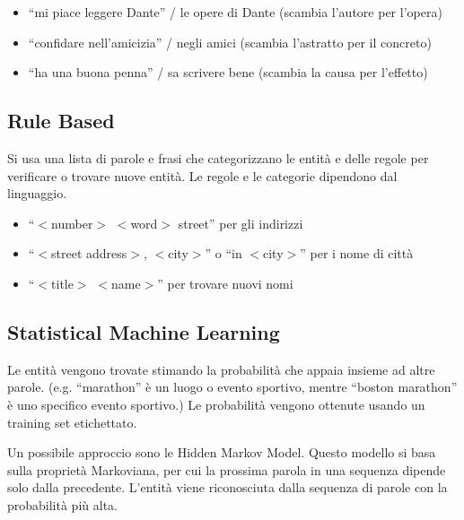 \begin{itemize}
  \item “mi piace leggere Dante” / le opere di Dante (scambia l'autore per l'opera)
  \item “confidare nell'amicizia” / negli amici (scambia l'astratto per il concreto)
  \item “ha una buona penna” / sa scrivere bene (scambia la causa per l'effetto)
\end{itemize}

\subsection*{Rule Based}
Si usa una lista di parole e frasi che categorizzano le entità e delle regole per verificare o trovare nuove entità.
Le regole e le categorie dipendono dal linguaggio.

\begin{itemize}
  \item “$<$number$>$ $<$word$>$ street” per gli indirizzi
  \item “$<$street address$>$, $<$city$>$” o “in $<$city$>$” per i nome di città
  \item “$<$title$>$ $<$name$>$” per trovare nuovi nomi
\end{itemize}

\subsection*{Statistical Machine Learning}
Le entità vengono trovate stimando la probabilità che appaia insieme ad altre parole.
(e.g. “marathon” è un luogo o evento sportivo, mentre “boston marathon” è uno specifico evento sportivo.)
Le probabilità vengono ottenute usando un training set etichettato.

Un possibile approccio sono le Hidden Markov Model. Questo modello si basa sulla proprietà Markoviana, per cui
la prossima parola in una sequenza dipende solo dalla precedente.
L'entità viene riconosciuta dalla sequenza di parole con la probabilità più alta.
